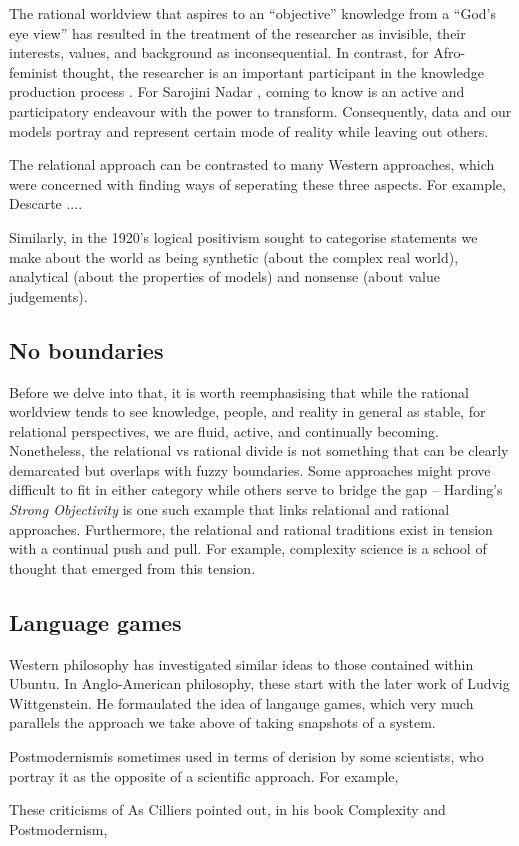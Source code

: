 The rational worldview that aspires to an ``objective'' knowledge from a ``God’s eye view'' has resulted in the treatment of the researcher as invisible, their interests, values, and background as inconsequential. In contrast, for Afro-feminist thought, the researcher is an important participant in the knowledge production process \cite{nnaemeka2004nego}. For Sarojini Nadar \cite{nadar2014stories}, coming to know is an active and participatory endeavour with the power to transform. Consequently, data and our models portray and represent certain mode of reality while leaving out others.   


The relational approach can be contrasted to many Western approaches, which were concerned with finding ways of seperating these three aspects. For example, Descarte ....

Similarly, in the 1920's logical positivism sought to categorise statements we make about the world as being synthetic (about the complex real world), analytical (about the properties of models) and nonsense (about value judgements). 

\subsection{No boundaries}


Before we delve into that, it is worth reemphasising that while the rational worldview tends to see knowledge, people, and reality in general as stable, for relational perspectives, we are fluid, active, and continually becoming. Nonetheless, the relational vs rational divide is not something that can be clearly demarcated but overlaps with fuzzy boundaries. Some approaches might prove difficult to fit in either category while others serve to bridge the gap -- Harding's \cite{harding1992rethinking} \textit{Strong Objectivity} is one such example that links relational and rational approaches. Furthermore, the relational and rational traditions exist in tension with a continual push and pull. For example, complexity science is a school of thought that emerged from this tension.   


\subsection{Language games}

Western philosophy has investigated similar ideas to those contained within Ubuntu. In Anglo-American philosophy, these start with the later work of Ludvig Wittgenstein. He formaulated the idea of langauge games, which very much parallels the approach we take above of taking snapshots of a system.

Postmodernismis sometimes used in terms of derision by some scientists, who portray it as the opposite of a scientific approach. For example,

These criticisms of 
As Cilliers pointed out, in his book Complexity and Postmodernism, 

